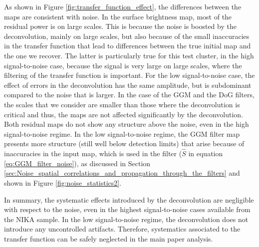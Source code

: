 \documentclass[twocolumn,traditabstract]{aa}
\begin{document}
{As shown in Figure \ref{fig:transfer_function_effect}, the differences between the maps are consistent with noise. In the surface brightness map, most of the residual power is on large scales. This is because the noise is boosted by the deconvolution, mainly on large scales, but also because of the small inaccuracies in the transfer function that lead to differences between the true initial map and the one we recover. The latter is particularly true for this test cluster, in the high signal-to-noise case, because the signal is very large on large scales, where the filtering of the transfer function is important. For the low signal-to-noise case, the effect of errors in the deconvolution has the same amplitude, but is subdominant compared to the noise that is larger. In the case of the GGM and the DoG filters, the scales that we consider are smaller than those where the deconvolution is critical and thus, the maps are not affected significantly by the deconvolution. Both residual maps do not show any structure above the noise, even in the high signal-to-noise regime. In the low signal-to-noise regime, the GGM filter map presents more structure (still well below detection limits) that arise because of inaccuracies in the input map, which is used in the filter ($\hat{S}$ in equation \ref{eq:GGM_filter_noise}), as discussed in Section \ref{sec:Noise_spatial_correlations_and_propagation_through_the_filters} and shown in Figure \ref{fig:noise_statistics2}.

In summary, the systematic effects introduced by the deconvolution are negligible with respect to the noise, even in the highest signal-to-noise cases available from the NIKA sample. In the low signal-to-noise regime, the deconvolution does not introduce any uncontrolled artifacts. Therefore, systematics associated to the transfer function can be safely neglected in the main paper analysis.}
\end{document}
